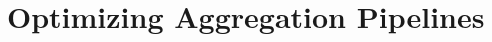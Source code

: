 \documentclass[twocolumn, 10pt]{article}
\begin{document}

%
%






\section{Optimizing Aggregation Pipelines}
\end{document}
